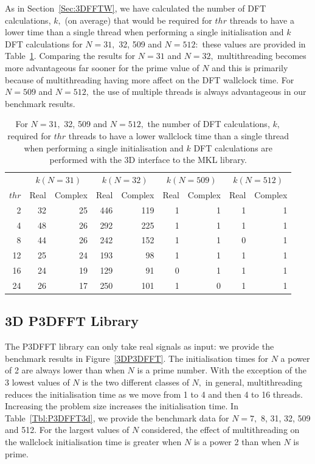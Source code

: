 \documentclass[a4paper]{article}
\begin{document}
As in Section~\ref{Sec:3DFFTW}, we have calculated the number of DFT
calculations, $k,$ (on average) that would be required for $thr$
threads to have a lower time than a single thread when performing a
single initialisation and $k$ DFT calculations for $N=31,$ 32, 509 and
$N=512:$ these values are provided in
Table~\ref{Tbl:MKL3dk}. Comparing the results for $N=31$ and $N=32,$
multithreading becomes more advantageous far sooner for the prime
value of $N$ and this is primarily because of multithreading having
more affect on the DFT wallclock time. For $N=509$ and $N=512,$ the
use of multiple threads is always advantageous in our benchmark
results.


\begin{table}
\begin{center}
\begin{tabular}{|r||r|r||r|r||r|r||r|r|}
  \hline
 & \multicolumn{2}{|c||}{$k(N=31)$} & \multicolumn{2}{|c||}{$k(N=32)$} & \multicolumn{2}{|c||}{$k(N=509)$} & \multicolumn{2}{|c|}{$k(N=512)$} \\
$thr$ &  Real & Complex &  Real & Complex &  Real & Complex &  Real & Complex  \\ \hline
  2 & 32    & 25  & 446   & 119  & 1 &  1   & 1  &  1 \\
  4 & 48    & 26  & 292   & 225  & 1 &  1   & 1  &  1 \\
  8 & 44    & 26  & 242   & 152  & 1 &  1   & 0  &  1 \\
  12 & 25   & 24  & 193   & 98   & 1 &  1   & 1  &  1 \\
  16 & 24   & 19  & 129   & 91   & 0 &  1   & 1  &  1 \\
  24 & 26   & 17  & 250   & 101  & 1 &  0   & 1  &  1 \\ \hline
\end{tabular}
\caption{ For $N=31,$ 32, 509 and $N=512,$ the number of DFT calculations, $k,$ required for $thr$ threads to have a lower wallclock time than a single thread when performing  a single initialisation and $k$ DFT calculations are performed with the 3D interface to the MKL library.  }\label{Tbl:MKL3dk}
\end{center}
\end{table}


\subsection{3D P3DFFT Library}\label{Sec:3DP3DFFT}
The P3DFFT library can only take real signals as input: we provide the
benchmark results in Figure~\ref{3DP3DFFT}. The initialisation times
for $N$ a power of 2 are always lower than when $N$ is a prime
number. With the exception of the 3 lowest values of $N$ is the two
different classes of $N,$ in general, multithreading reduces the
initialisation time as we move from 1 to 4 and then 4 to 16
threads. Increasing the problem size increases the initialisation
time. In Table~\ref{Tbl:P3DFFT3d}, we provide the benchmark data for
$N=7,$ 8, 31, 32, 509 and 512. For the largest values of $N$
considered, the effect of multithreading on the wallclock
initialisation time is greater when $N$ is a power 2 than when $N$ is
prime.
\end{document}
